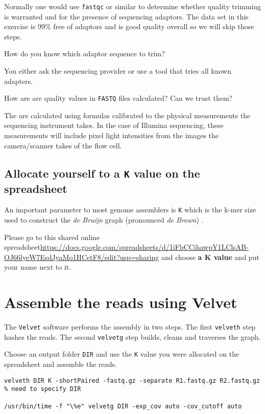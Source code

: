 Normally one would use \texttt{fastqc} or similar to determine whether
quality trimming is warranted and for the presence of sequencing adaptors.
The data set in this exercise is 99\% free of adaptors and is good quality
overall so we will skip those steps.
\begin{questions}
How do you know which adaptor sequence to trim? \\
\begin{answer}
You either ask the sequencing provider or use a tool that tries all known adapters.
\end{answer}
How are are quality values in \texttt{FASTQ} files calculated? Can we trust them? \\
\begin{answer}
The are calculated using formulas calibrated to the physical measurements the
sequencing instrument takes. In the case of Illumina sequencing, these measurements
will include pixel light intensities from the images the camera/scanner takes
of the flow cell.
\end{answer}
\end{questions}

\subsection{Allocate yourself to a \texttt{K} value on the spreadsheet}

An important parameter to most genome assemblers is \texttt{K} which is the
k-mer size used to construct the \textit{de Bruijn} graph (pronounced \textit{de Brown}) .

Please go to this shared online spreadsheet\url{https://docs.google.com/spreadsheets/d/1iFbCCihawpY1LClsAB-OJ66lyeW7EsdJyaMo1HCetF8/edit?usp=sharing}
and choose \textbf{a K value} and put your name next to it.

\section{Assemble the reads using Velvet}
The \texttt{Velvet} software performs the assembly in two steps. The first \texttt{velveth}
step hashes the reads. The second \texttt{velvetg} step builds, cleans and traverses the graph.

\begin{steps}
Choose an output folder \texttt{DIR} and use the \texttt{K} value you were allocated
on the spreadsheet and assemble the reads.
\begin{lstlisting}
velveth DIR K -shortPaired -fastq.gz -separate R1.fastq.gz R2.fastq.gz % need to specify DIR

/usr/bin/time -f "\%e" velvetg DIR -exp_cov auto -cov_cutoff auto
\end{lstlisting}
\end{steps}

